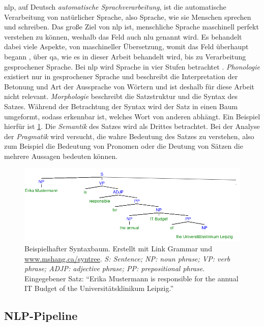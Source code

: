 \acf{nlp}, auf Deutsch \emph{automatische Sprachverarbeitung}, ist die automatische Verarbeitung von natürlicher Sprache, also Sprache, wie sie Menschen sprechen und schreiben.
Das große Ziel von \ac{nlp} ist, menschliche Sprache maschinell perfekt verstehen zu können, weshalb das Feld auch \ac{nlu} genannt wird.
Es behandelt dabei viele Aspekte, von maschineller Übersetzung, womit das Feld überhaupt begann \citep{nlphistory}, über \ac{qa},
wie es in dieser Arbeit behandelt wird, bis zu Verarbeitung gesprochener Sprache.
Bei \ac{nlp} wird Sprache in vier Stufen betrachtet \citep{nlpreviewtts}.
\emph{Phonologie} existiert nur in gesprochener Sprache und beschreibt die Interpretation der Betonung und Art der Aussprache von Wörtern und ist deshalb für diese Arbeit nicht relevant.
\emph{Morphologie} beschreibt die Satzstruktur und die Syntax des Satzes.
Während der Betrachtung der Syntax wird der Satz in einen Baum umgeformt, sodass erkennbar ist, welches Wort von anderen abhängt.
Ein Beispiel hierfür ist \cref{fig:syntaxtree}.
Die \emph{Semantik} des Satzes wird als Drittes betrachtet.
Bei der Analyse der \emph{Pragmatik} wird versucht, die wahre Bedeutung des Satzes zu verstehen, also zum Beispiel die Bedeutung von Pronomen oder die Deutung von Sätzen die mehrere Aussagen bedeuten können.
\begin{figure}%
\centering
\includegraphics[width=\textwidth, height=\textheight, keepaspectratio]{Images/syntaxtree.png}
\caption[Beispielhafter Syntaxbaum]{Beispielhafter Syntaxbaum. Erstellt mit Link Grammar \citep{grammarparser} und \url{www.mshang.ca/syntree}.
\emph{S: Sentence; NP: noun phrase; VP: verb phrase; ADJP: adjective phrase; PP: prepositional phrase}.
Eingegebener Satz: \enquote{Erika Mustermann is responsible for the annual IT Budget of the Universitätsklinikum Leipzig.}}
\label{fig:syntaxtree}
\end{figure}

\subsection{NLP-Pipeline}

